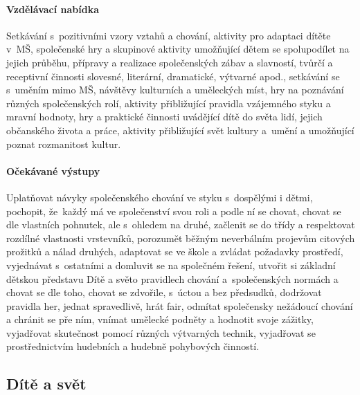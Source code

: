 					\paragraph{Vzdělávací nabídka}
						Setkávání s pozitivními vzory vztahů a chování, aktivity pro adaptaci dítěte v MŠ, společenské hry a skupinové aktivity umožňující dětem se spolupodílet na jejich průběhu, přípravy a realizace společenských zábav a slavností, tvůrčí a receptivní činnosti slovesné, literární, dramatické, výtvarné apod., setkávání se s uměním mimo MŠ, návštěvy kulturních a uměleckých míst, hry na poznávání různých společenských rolí, aktivity přibližující pravidla vzájemného styku a mravní hodnoty, hry a praktické činnosti uvádějící dítě do světa lidí, jejich občanského života a práce, aktivity přibližující svět kultury a umění a umožňující poznat rozmanitost kultur.
					\paragraph{Očekávané výstupy}
						Uplatňovat návyky společenského chování ve styku s dospělými i dětmi, pochopit, že každý má ve společenství svou roli a podle ní se chovat, chovat se dle vlastních pohnutek, ale s ohledem na druhé, začlenit se do třídy a respektovat rozdílné vlastnosti vrstevníků, porozumět běžným neverbálním projevům citových prožitků a nálad druhých, adaptovat se ve škole a zvládat požadavky prostředí, vyjednávat s ostatními a domluvit se na společném řešení, utvořit si základní dětskou představu Dítě a světo pravidlech chování a společenských normách a chovat se dle toho, chovat se zdvořile, s úctou a bez předsudků, dodržovat pravidla her, jednat spravedlivě, hrát fair, odmítat společensky nežádoucí chování a chránit se pře ním, vnímat umělecké podněty a hodnotit svoje zážitky, vyjadřovat skutečnost pomocí různých výtvarných technik, vyjadřovat se prostřednictvím hudebních a hudebně pohybových činností.

			\subsection{Dítě a svět}
				\textit{} \citep[s.~29]{RVP}

